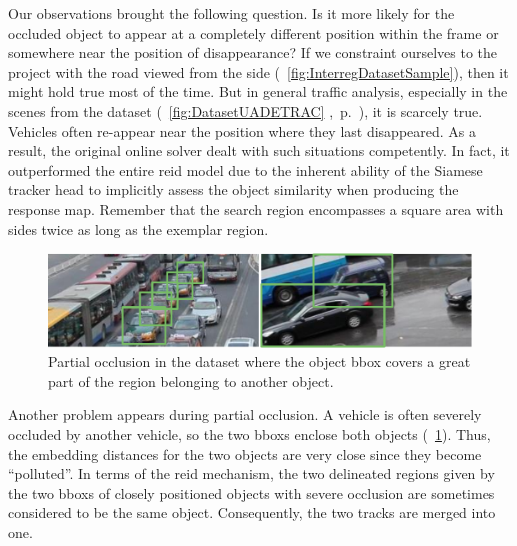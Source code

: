Our observations brought the following question. Is it more likely for the occluded object to appear at a completely different position within the frame or somewhere near the position of disappearance? If we constraint ourselves to the \interreg{} project with the road viewed from the side (\figtext{}~\ref{fig:InterregDatasetSample}), then it might hold true most of the time. But in general traffic analysis, especially in the scenes from the \uadetrac{} dataset (\figtext{}~\ref{fig:DatasetUADETRAC} ,~p.~\pageref{fig:DatasetUADETRAC}), it is scarcely true. Vehicles often re-appear near the position where they last disappeared. As a result, the original online solver dealt with such situations competently. In fact, it outperformed the entire \gls{reid} model due to the inherent ability of the Siamese tracker head to implicitly assess the object similarity when producing the response map. Remember that the search region encompasses a square area with sides twice as long as the exemplar region.

\begin{figure}[!t]
    \centering
    \includegraphics[width=\linewidth]{figures/siamese_tracking/uadetrac_partial_occlusion_multiple_cars.pdf}
    \caption[Partial occlusion in \uadetrac{} dataset]{Partial occlusion in the \uadetrac{} dataset where the object \gls{bbox} covers a great part of the region belonging to another object.}
    \label{fig:UADETRACPartialOcclusionMultiple}
\end{figure}

Another problem appears during partial occlusion. A vehicle is often severely occluded by another vehicle, so the two \glspl{bbox} enclose both objects (\figtext{}~\ref{fig:UADETRACPartialOcclusionMultiple}). Thus, the embedding distances for the two objects are very close since they become ``polluted''. In terms of the \gls{reid} mechanism, the two delineated regions given by the two \glspl{bbox} of closely positioned objects with severe occlusion are sometimes considered to be the same object. Consequently, the two tracks are merged into one.


